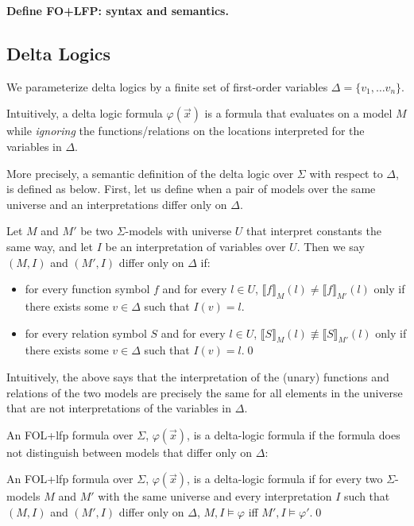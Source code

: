 {\bf Define FO+LFP: syntax and semantics.}




\subsection{Delta Logics}

We parameterize delta logics by a finite set of first-order variables 
$\Delta = \{ v_1, \ldots v_n\}$.

Intuitively, a delta logic formula $\varphi(\vec{x})$ is a formula that evaluates
on a model $M$ while \emph{ignoring} the functions/relations on the locations interpreted
for the variables in $\Delta$. 

More precisely, a semantic definition of the delta logic over $\Sigma$ with respect 
to $\Delta$, is defined as below. First, let us define when a pair of models over the same
universe and an interpretations differ only on $\Delta$.

\begin{definition}
Let $M$ and $M'$  be two $\Sigma$-models with universe $U$ that interpret constants the same way,
and let $I$ be an interpretation of variables over $U$.
Then we say $(M, I)$ and $(M', I)$ differ only on $\Delta$ if:
\begin{itemize}
	\item  for every
	function symbol $f$ and for every $l \in U$, $\llbracket f \rrbracket_M(l)  \not = \llbracket f \rrbracket_{M'}(l)$ only if
	there exists some $v \in \Delta$ such that $I(v) = l$.
	
	\item  for every relation symbol $S$ and for every $l \in U$, $\llbracket S \rrbracket_M(l)  \not \equiv \llbracket S \rrbracket_{M'}(l) $ only if 
there exists some $v \in \Delta$ such that $I(v) = l$.\qed	
\end{itemize}
\end{definition}

Intuitively, the above says that the interpretation of the (unary) functions and relations of the two models are 
precisely the same for all elements in the universe that are not interpretations of the variables in $\Delta$.

An FOL+lfp formula over $\Sigma$, $\varphi(\vec{x})$, is a delta-logic formula
if the formula does not distinguish between models that differ only on $\Delta$:


\begin{definition}
An FOL+lfp formula over $\Sigma$, $\varphi(\vec{x})$, is a delta-logic formula
if for every two $\Sigma$-models $M$ and $M'$ with the same universe and every interpretation $I$ 
such that $(M, I)$ and $(M', I)$ differ only on $\Delta$, 
$M, I \models \varphi$ iff $M', I \models \varphi'$.\qed
\end{definition}

